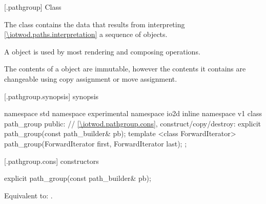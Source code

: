  [\iotwod.pathgroup] {Class }

\pnum
{}
The class  contains the data that results from interpreting \ref{\iotwod.paths.interpretation} a sequence of  objects. %

\pnum
A  object is used by most rendering and composing operations.

\pnum
The contents of a  object are immutable, however the contents it contains are changeable using copy assignment or move assignment.

%

%
 [\iotwod.pathgroup.synopsis] { synopsis}

\begin{codeblock}
namespace std { namespace experimental { namespace io2d { inline namespace v1 {
  class path_group {
    public:
    // \ref{\iotwod.pathgroup.cons}, construct/copy/destroy:
    explicit path_group(const path_builder& pb);
    template <class ForwardIterator>
    path_group(ForwardIterator first, ForwardIterator last);
  };
} } } }
\end{codeblock}

 [\iotwod.pathgroup.cons] { constructors}

\begin{itemdecl}
    explicit path_group(const path_builder& pb);
\end{itemdecl}
\begin{itemdescr}
\pnum
\effects
Equivalent to: .	
\end{itemdescr}

